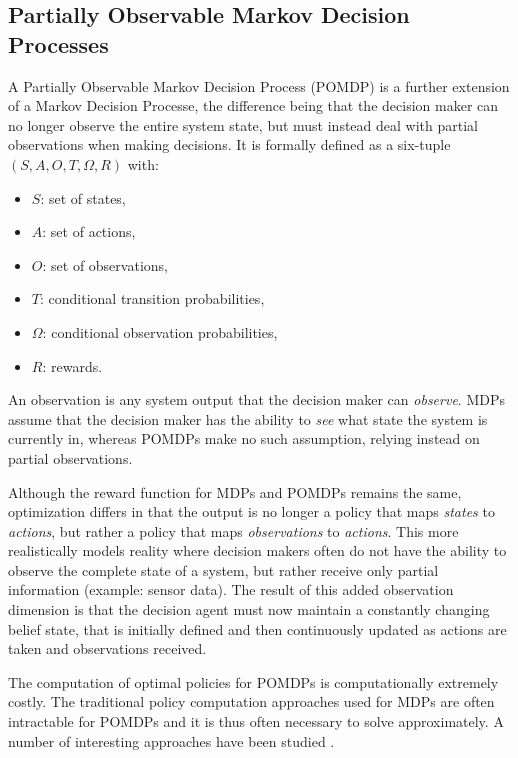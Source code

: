 \subsection{Partially Observable Markov Decision Processes}

A Partially Observable Markov Decision Process (POMDP) is a further extension of a Markov Decision Processe, the difference being that the decision maker can no longer observe the entire system state, but must instead deal with partial observations when making decisions. It is formally defined as a six-tuple $(S,A,O,T,\Omega,R)$ with:
\begin{itemize}
\item $S$: set of states,
\item $A$: set of actions,
\item $O$: set of observations,
\item $T$: conditional transition probabilities,
\item $\Omega$: conditional observation probabilities,
\item $R$: rewards.
\end{itemize}

An observation is any system output that the decision maker can \textit{observe}. MDPs assume that the decision maker has the ability to \textit{see} what state the system is currently in, whereas POMDPs make no such assumption, relying instead on partial observations.

Although the reward function for MDPs and POMDPs remains the same, optimization differs in that the output is no longer a policy that maps \textit{states} to \textit{actions}, but rather a policy that maps \textit{observations} to \textit{actions}. This more realistically models reality where decision makers often do not have the ability to observe the complete state of a system, but rather receive only partial information (example: sensor data). The result of this added observation dimension is that the decision agent must now maintain a constantly changing belief state, that is initially defined and then continuously updated as actions are taken and observations received.

The computation of optimal policies for POMDPs is computationally extremely costly. The traditional policy computation approaches used for MDPs are often intractable for POMDPs and it is thus often necessary to solve approximately. A number of interesting approaches have been studied \cite{Hansen98}.